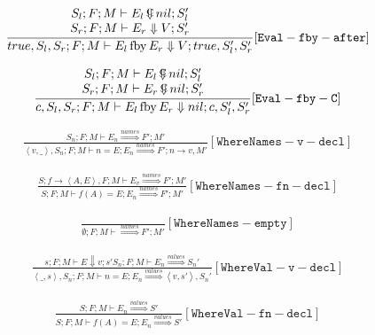 \documentclass{scrartcl}
\DeclareMathOperator{\fby}{fby}
\DeclareMathOperator{\ceval}{\overset{C}{\smash{\Downarrow}}}
\begin{document}
    \begin{align*}
    \frac{
        \begin{matrix}
        S_l; F; M \vdash E_l  \ceval nil; S_l' \\
        S_r; F; M \vdash E_r \Downarrow V; S_r'
        \end{matrix}
    }{
        true, S_l, S_r; F; M \vdash E_l \fby E_r \Downarrow V; true, S_l', S_r'
    }[\mathtt{Eval-fby-after}]
    \end{align*}
    
    \begin{align*}
    \frac{
        \begin{matrix}
        S_l; F; M \vdash E_l  \ceval nil; S_l' \\
        S_r; F; M \vdash E_r  \ceval nil; S_r'
        \end{matrix}
    }{
        c, S_l, S_r; F; M \vdash E_l \fby E_r \Downarrow nil; c, S_l', S_r'
    }[\mathtt{Eval-fby-C}]
    \end{align*}
    
    \begin{align*}
    \frac{
        S_n; F; M \vdash E_n \overset{names}{\Rightarrow} F'; M'
    }{
        \left<v, \_ \right>, S_n; F; M \vdash n = E; E_n \overset{names}{\Rightarrow} F'; n \to v, M'
    }[\mathtt{WhereNames-v-decl}]
    \end{align*}
    
    \begin{align*}
    \frac{
        S; f \to \left< A, E \right >, F; M \vdash E_v \overset{names}{\Rightarrow} F'; M'
    }{
        S; F; M \vdash f(A) = E; E_n \overset{names}{\Rightarrow} F'; M'
    }[\mathtt{WhereNames-fn-decl}]
    \end{align*}
    
    \begin{align*}
    \frac{}{
        \emptyset; F; M \vdash \overset{names}{\Rightarrow} F'; M'
    }[\mathtt{WhereNames-empty}]
    \end{align*}
    
    \begin{align*}
    \frac{
        s; F; M \vdash E \Downarrow v; s'
        S_n; F; M \vdash E_n \overset{values}{\Rightarrow} S_n'
    }{
        \left<\_, s\right>, S_n; F; M \vdash n = E; E_n \overset{values}{\Rightarrow} \left<v, s'\right>, S_n'
    }[\mathtt{WhereVal-v-decl}]
    \end{align*}
    
    \begin{align*}
    \frac{
        S; F; M \vdash E_n \overset{values}{\Rightarrow} S'
    }{
        S; F; M \vdash f(A) = E; E_n \overset{values}{\Rightarrow} S'
    }[\mathtt{WhereVal-fn-decl}]
    \end{align*}
    
\end{document}
